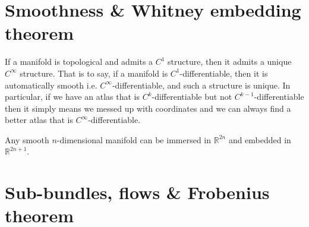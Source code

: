 \documentclass[../geometry_main.tex]{subfiles}
\begin{document}
\section{Smoothness \& Whitney embedding theorem} 

\begin{mytheorem}
If a manifold is topological and admits a $C^{1}$ structure, then it admits a unique $C^{\infty}$ structure.
That is to say, if a manifold is $C^{1}$-differentiable, then it is automatically smooth i.e. $C^{\infty}$-differentiable, and such a structure is unique.
In particular, if we have an atlas that is $C^{k}$-differentiable but not $C^{k-1}$-differentiable then it simply means we messed up with coordinates and we can always find a better atlas that is $C^{\infty}$-differentiable.
\end{mytheorem}


\begin{mytheorem}
Any smooth $n$-dimensional manifold can be immersed in $\mathbb{R}^{2n}$ and embedded in $\mathbb{R}^{2n+1}$.
\end{mytheorem}

\section{Sub-bundles, flows \& Frobenius theorem} 
\end{document}
